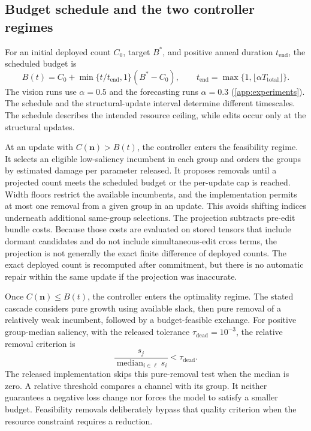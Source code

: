 \documentclass[10pt]{article}
\theoremstyle{paper}
\begin{document}
\subsection{Budget schedule and the two controller regimes}
\label{app:budget-controller}
For an initial deployed count $C_0$, target $B^*$, and positive anneal duration $t_{\mathrm{end}}$, the scheduled budget is
\begin{equation}
B(t)=C_0+\min\{t/t_{\mathrm{end}},1\}(B^*-C_0),
\qquad t_{\mathrm{end}}=\max\{1,\lfloor\alpha T_{\mathrm{total}}\rfloor\}.
\label{eq:anneal}
\end{equation}
The vision runs use $\alpha=0.5$ and the forecasting runs $\alpha=0.3$ (\cref{app:experiments}). The schedule and the structural-update interval determine different timescales. The schedule describes the intended resource ceiling, while edits occur only at the structural updates.

At an update with $C(\bm n)>B(t)$, the controller enters the feasibility regime. It selects an eligible low-saliency incumbent in each group and orders the groups by estimated damage per parameter released. It proposes removals until a projected count meets the scheduled budget or the per-update cap is reached. Width floors restrict the available incumbents, and the implementation permits at most one removal from a given group in an update. This avoids shifting indices underneath additional same-group selections. The projection subtracts pre-edit bundle costs. Because those costs are evaluated on stored tensors that include dormant candidates and do not include simultaneous-edit cross terms, the projection is not generally the exact finite difference of deployed counts. The exact deployed count is recomputed after commitment, but there is no automatic repair within the same update if the projection was inaccurate.

Once $C(\bm n)\le B(t)$, the controller enters the optimality regime. The stated cascade considers pure growth using available slack, then pure removal of a relatively weak incumbent, followed by a budget-feasible exchange. For positive group-median saliency, with the released tolerance $\tau_{\mathrm{dead}}=10^{-3}$, the relative removal criterion is
\begin{equation}
\frac{s_j}{\operatorname{median}_{i\in\ell}s_i}<\tau_{\mathrm{dead}}.
\label{eq:relativeprune}
\end{equation}
The released implementation skips this pure-removal test when the median is zero. A relative threshold compares a channel with its group. It neither guarantees a negative loss change nor forces the model to satisfy a smaller budget. Feasibility removals deliberately bypass that quality criterion when the resource constraint requires a reduction.
\end{document}

